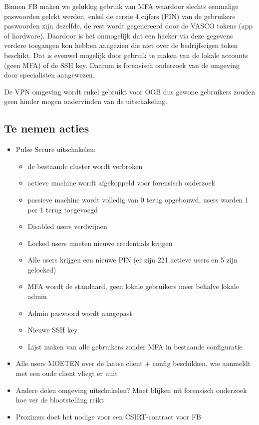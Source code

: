 \documentclass[11pt]{article}
\begin{document}
Binnen FB maken we gelukkig gebruik van MFA waardoor slechts eenmalige paswoorden gelekt werden, enkel de eerste 4 cijfers (PIN) van de gebruikers paswoorden zijn dezelfde, de rest wordt gegenereerd door de VASCO tokens (app of hardware). Daardoor is het onmogelijk dat een hacker via deze gegevens verdere toegangen kon hebben aangezien die niet over de bedrijfseigen token beschikt. Dat is evenwel mogelijk door gebruik te maken van de lokale accounts (geen MFA) of de SSH key.
Daarom is forensisch onderzoek van de omgeving door specialisten aangewezen.

De VPN omgeving wordt enkel gebruikt voor OOB dus gewone gebruikers zouden geen hinder mogen ondervinden van de uitschakeling.

\subsection{Te nemen acties}
\label{sec:orgb96bb89}
\begin{itemize}
\item Pulse Secure uitschakelen:
\begin{itemize}
\item de bestaande cluster wordt verbroken
\item actieve machine wordt afgekoppeld voor forensisch onderzoek
\item passieve machine wordt volledig van 0 terug opgebouwd, users worden 1 per 1 terug toegevoegd
\item Disabled users verdwijnen
\item Locked users moeten nieuwe credentials krijgen
\item Alle users krijgen een nieuwe PIN (er zijn 221 actieve users en 5 zijn gelocked)
\item MFA wordt de standaard, geen lokale gebruikers meer behalve lokale admin
\item Admin paswoord wordt aangepast
\item Nieuwe SSH key
\item Lijst maken van alle gebruikers zonder MFA in bestaande configuratie
\end{itemize}
\item Alle users MOETEN over de laatse client + config beschikken, wie aanmeldt met een oude client vliegt er uuit
\item Andere delen omgeving uitschakelen? Moet blijken uit forensisch onderzoek hoe ver de blootstelling reikt
\item Proximus doet het nodige voor een CSIRT-contract voor FB
\end{itemize}
\end{document}
